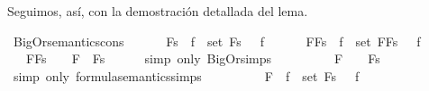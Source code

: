 \begin{isabellebody}
\begin{isamarkuptext}
  Seguimos, así, con la demostración detallada del lema.%
\end{isamarkuptext}\isamarkuptrue%
\isamarkupfalse%
\ BigOr{\isacharunderscore}semantics{\isacharunderscore}cons{\isacharcolon}\ \isanewline
\ \ \ {\isachardoublequoteopen}{\isacharparenleft}{\isasymA}\ {\isasymTurnstile}\ \isactrlbold {\isasymOr}Fs{\isacharparenright}\ {\isasymlongleftrightarrow}\ {\isacharparenleft}{\isasymexists}f\ {\isasymin}\ set\ Fs{\isachardot}\ {\isasymA}\ {\isasymTurnstile}\ f{\isacharparenright}{\isachardoublequoteclose}\ \isanewline
\ \ \ {\isachardoublequoteopen}{\isacharparenleft}{\isasymA}\ {\isasymTurnstile}\ \isactrlbold {\isasymOr}{\isacharparenleft}F{\isacharhash}Fs{\isacharparenright}{\isacharparenright}\ {\isasymlongleftrightarrow}\ {\isacharparenleft}{\isasymexists}f\ {\isasymin}\ set\ {\isacharparenleft}F{\isacharhash}Fs{\isacharparenright}{\isachardot}\ {\isasymA}\ {\isasymTurnstile}\ f{\isacharparenright}{\isachardoublequoteclose}\ \isanewline
%
\isadelimproof
%
\endisadelimproof
%
\isatagproof
{}\isamarkupfalse%
\ {\isacharminus}\isanewline
\ \ \isamarkupfalse%
\ {\isachardoublequoteopen}{\isacharparenleft}{\isasymA}\ {\isasymTurnstile}\ \isactrlbold {\isasymOr}{\isacharparenleft}F{\isacharhash}Fs{\isacharparenright}{\isacharparenright}\ {\isacharequal}\ {\isasymA}\ {\isasymTurnstile}\ F\ \isactrlbold {\isasymor}\ \isactrlbold {\isasymOr}Fs{\isachardoublequoteclose}\isanewline
\ \ \ \ \isamarkupfalse%
\ {\isacharparenleft}simp\ only{\isacharcolon}\ BigOr{\isachardot}simps{\isacharparenleft}{}{\isacharparenright}{\isacharparenright}\isanewline
\ \ \isamarkupfalse%
\ \isamarkupfalse%
\ {\isachardoublequoteopen}{\isasymdots}\ {\isacharequal}\ {\isacharparenleft}{\isasymA}\ {\isasymTurnstile}\ F\ {\isasymor}\ {\isasymA}\ {\isasymTurnstile}\ \isactrlbold {\isasymOr}Fs{\isacharparenright}{\isachardoublequoteclose}\isanewline
\ \ \ \ \isamarkupfalse%
\ {\isacharparenleft}simp\ only{\isacharcolon}\ formula{\isacharunderscore}semantics{\isachardot}simps{\isacharparenleft}{}{\isacharparenright}{\isacharparenright}\isanewline
\ \ \isamarkupfalse%
\ \isamarkupfalse%
\ {\isachardoublequoteopen}{\isasymdots}\ {\isacharequal}\ {\isacharparenleft}{\isasymA}\ {\isasymTurnstile}\ F\ {\isasymor}\ {\isacharparenleft}{\isasymexists}f\ {\isasymin}\ set\ Fs{\isachardot}\ {\isasymA}\ {\isasymTurnstile}\ f{\isacharparenright}{\isacharparenright}{\isachardoublequoteclose}\isanewline

\end{isabellebody}

